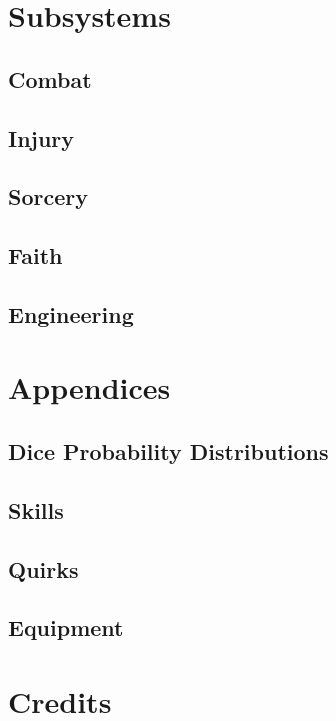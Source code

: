     \part{Subsystems}
    \renewcommand{\hsubtitle}{Change Through Purpose.}

    \chapter{Combat}
    \renewcommand{\hsubtitle}{Violence is an Option.}
    
    \chapter{Injury}
    \renewcommand{\hsubtitle}{Violence was not the Move.}

    \chapter{Sorcery}
    \renewcommand{\hsubtitle}{Magic is an Option.}

    \chapter{Faith}
    \renewcommand{\hsubtitle}{I Pray you Choose Wisely.}

    \chapter{Engineering}
    \renewcommand{\hsubtitle}{There is only the Machine.}

    \renewcommand{\hsubtitle}{Change Through Purpose.}
    \part{Appendices}
    \begin{appendices}
        \chapter{Dice Probability Distributions}

        \chapter{Skills}

        \chapter{Quirks}

        \chapter{Equipment}

    \end{appendices}

    \part{Credits}
    \renewcommand{\hsubtitle}{Thank You.}
    


